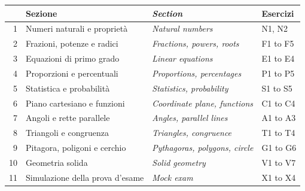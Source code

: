 \begin{center}
\small
\renewcommand{\arraystretch}{1.15}
\begin{tabular}{@{}rlll@{}}
\toprule
& \textbf{Sezione} & \textbf{\itshape\color{engray}Section} & \textbf{Esercizi}\\
\midrule
1 & Numeri naturali e proprietà & \itshape\color{engray}Natural numbers & N1, N2\\
2 & Frazioni, potenze e radici & \itshape\color{engray}Fractions, powers, roots & F1 to F5\\
3 & Equazioni di primo grado & \itshape\color{engray}Linear equations & E1 to E4\\
4 & Proporzioni e percentuali & \itshape\color{engray}Proportions, percentages & P1 to P5\\
5 & Statistica e probabilità & \itshape\color{engray}Statistics, probability & S1 to S5\\
6 & Piano cartesiano e funzioni & \itshape\color{engray}Coordinate plane, functions & C1 to C4\\
7 & Angoli e rette parallele & \itshape\color{engray}Angles, parallel lines & A1 to A3\\
8 & Triangoli e congruenza & \itshape\color{engray}Triangles, congruence & T1 to T4\\
9 & Pitagora, poligoni e cerchio & \itshape\color{engray}Pythagoras, polygons, circle & G1 to G6\\
10 & Geometria solida & \itshape\color{engray}Solid geometry & V1 to V7\\
11 & Simulazione della prova d'esame & \itshape\color{engray}Mock exam & X1 to X4\\
\bottomrule
\end{tabular}
\end{center}



\clearpage




